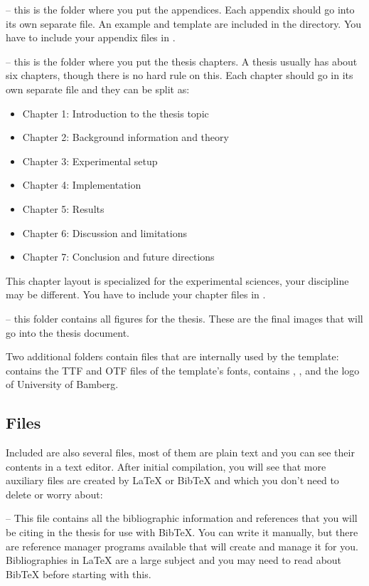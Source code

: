  -- this is the folder where you put the appendices. Each appendix should go into its own separate  file. An example and template are included in the directory. You have to include your appendix files in .

 -- this is the folder where you put the thesis chapters. A thesis usually has about six chapters, though there is no hard rule on this. Each chapter should go in its own separate  file and they can be split as:
\begin{itemize}
\item Chapter 1: Introduction to the thesis topic
\item Chapter 2: Background information and theory
\item Chapter 3: Experimental setup
\item Chapter 4: Implementation
\item Chapter 5: Results
\item Chapter 6: Discussion and limitations
\item Chapter 7: Conclusion and future directions
\end{itemize}

This chapter layout is specialized for the experimental sciences, your discipline may be different. You have to include your chapter files in .

 -- this folder contains all figures for the thesis. These are the final images that will go into the thesis document.

Two additional folders contain files that are internally used by the template:  contains the TTF and OTF files of the template's fonts,  contains , , and the logo of University of Bamberg.

\subsection{Files}

Included are also several files, most of them are plain text and you can see their contents in a text editor. After initial compilation, you will see that more auxiliary files are created by LaTeX or BibTeX and which you don't need to delete or worry about:

 -- This file contains all the bibliographic information and references that you will be citing in the thesis for use with BibTeX. You can write it manually, but there are reference manager programs available that will create and manage it for you. Bibliographies in LaTeX are a large subject and you may need to read about BibTeX before starting with this.


